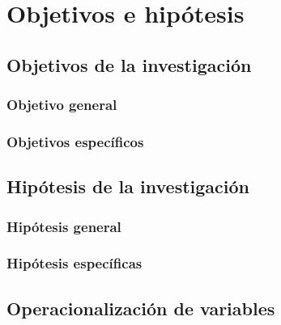\chapter{Objetivos e hipótesis}
\section{Objetivos de la investigación}
\subsection{Objetivo general}
\subsection{Objetivos específicos}
\section{Hipótesis de la investigación}
\subsection{Hipótesis general}
\subsection{Hipótesis específicas}
\section{Operacionalización de variables}
